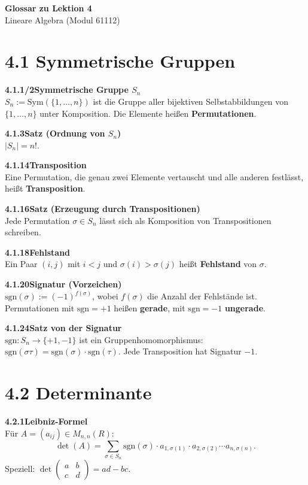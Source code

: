 \documentclass[a4paper,12pt]{article}
\newcommand{\gentry}[3]{%
  \noindent\textbf{#1\quad #2}\nopagebreak\\[0.2em]
  #3\par\smallskip
}
\begin{document}
\begin{center}
  {\LARGE\bfseries Glossar zu Lektion 4}\\[0.5em]
  {\large Lineare Algebra (Modul 61112)}
\end{center}

\vspace{0.8em}

\section*{4.1 \quad Symmetrische Gruppen}

\gentry{4.1.1/2}{Symmetrische Gruppe $S_n$}{%
  $S_n := \mathrm{Sym}(\{1,\ldots,n\})$ ist die Gruppe aller bijektiven Selbstabbildungen von $\{1,\ldots,n\}$ unter Komposition. Die Elemente heißen \textbf{Permutationen}.
}

\gentry{4.1.3}{Satz (Ordnung von $S_n$)}{$|S_n| = n!$.}

\gentry{4.1.14}{Transposition}{%
  Eine Permutation, die genau zwei Elemente vertauscht und alle anderen festlässt, heißt \textbf{Transposition}.
}

\gentry{4.1.16}{Satz (Erzeugung durch Transpositionen)}{%
  Jede Permutation $\sigma \in S_n$ lässt sich als Komposition von Transpositionen schreiben.
}

\gentry{4.1.18}{Fehlstand}{%
  Ein Paar $(i,j)$ mit $i < j$ und $\sigma(i) > \sigma(j)$ heißt \textbf{Fehlstand} von $\sigma$.
}

\gentry{4.1.20}{Signatur (Vorzeichen)}{%
  $\mathrm{sgn}(\sigma) := (-1)^{f(\sigma)}$, wobei $f(\sigma)$ die Anzahl der Fehlstände ist.
  Permutationen mit $\mathrm{sgn} = +1$ heißen \textbf{gerade}, mit $\mathrm{sgn} = -1$ \textbf{ungerade}.
}

\gentry{4.1.24}{Satz von der Signatur}{%
  $\mathrm{sgn}: S_n \to \{+1,-1\}$ ist ein Gruppenhomomorphismus: $\mathrm{sgn}(\sigma\tau) = \mathrm{sgn}(\sigma)\cdot\mathrm{sgn}(\tau)$.
  Jede Transposition hat Signatur $-1$.
}

\section*{4.2 \quad Determinante}

\gentry{4.2.1}{Leibniz-Formel}{%
  Für $A = (a_{ij}) \in M_{n,n}(R)$:
  \[
    \det(A) = \sum_{\sigma \in S_n} \mathrm{sgn}(\sigma) \cdot a_{1,\sigma(1)} \cdot a_{2,\sigma(2)} \cdots a_{n,\sigma(n)}.
  \]
  Speziell: $\det\begin{pmatrix}a&b\\c&d\end{pmatrix} = ad - bc$.
}
\end{document}
